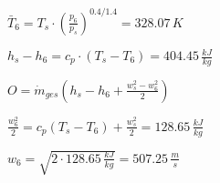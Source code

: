 \( \bar{T}_6 = T_s \cdot \left( \frac{p_6}{p_s} \right)^{0.4 / 1.4} = 328.07 \, K \)  

\( h_s - h_6 = c_p \cdot (T_s - T_6) = 404.45 \, \frac{kJ}{kg} \)  

\( O = \dot{m}_{ges} \left( h_s - h_6 + \frac{w_s^2 - w_6^2}{2} \right) \)  

\( \frac{w_6^2}{2} = c_p (T_s - T_6) + \frac{w_s^2}{2} = 128.65 \, \frac{kJ}{kg} \)  

\( w_6 = \sqrt{2 \cdot 128.65 \, \frac{kJ}{kg}} = 507.25 \, \frac{m}{s} \)